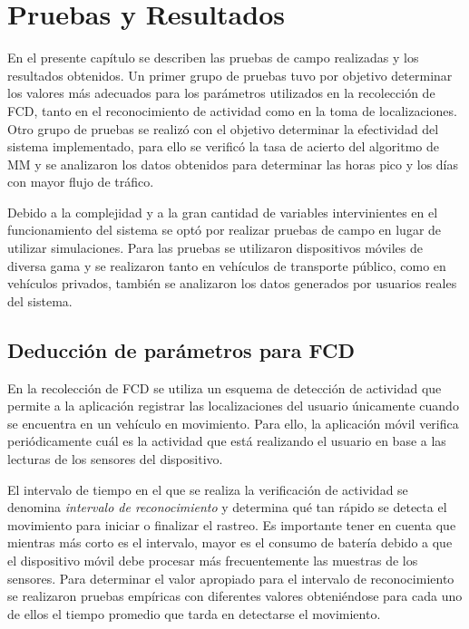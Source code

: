 \chapter{Pruebas y Resultados}
\label{cap:7}

En el presente capítulo se describen las pruebas de campo realizadas y los resultados obtenidos. Un primer grupo de pruebas tuvo por objetivo determinar los valores más adecuados para los parámetros utilizados en la recolección de FCD, tanto en el reconocimiento de actividad como en la toma de localizaciones. Otro grupo de pruebas se realizó con el objetivo determinar la efectividad del sistema implementado, para ello se verificó la tasa de acierto del algoritmo de MM y se analizaron los datos obtenidos para determinar las horas pico y los días con mayor flujo de tráfico.

Debido a la complejidad y a la gran cantidad de variables intervinientes en el funcionamiento del sistema se optó por realizar pruebas de campo en lugar de utilizar simulaciones. Para las pruebas se utilizaron dispositivos móviles de diversa gama y se realizaron tanto en vehículos de transporte público, como en vehículos privados, también se analizaron los datos generados por usuarios reales del sistema. 

\section{Deducción de parámetros para FCD}

En la recolección de FCD se utiliza un esquema de detección de actividad que permite a la aplicación registrar las localizaciones del usuario únicamente cuando se encuentra en un vehículo en movimiento. Para ello, la aplicación móvil verifica periódicamente cuál es la actividad que está realizando el usuario en base a las lecturas de los sensores del dispositivo. 

El intervalo de tiempo en el que se realiza la verificación de actividad se denomina \emph{intervalo de reconocimiento} y determina qué tan rápido se detecta el movimiento para iniciar o finalizar el rastreo. Es importante tener en cuenta que mientras más corto es el intervalo, mayor es el consumo de batería debido a que el dispositivo móvil debe procesar más frecuentemente las muestras de los sensores. Para determinar el valor apropiado para el intervalo de reconocimiento se realizaron pruebas empíricas con diferentes valores obteniéndose para cada uno de ellos el tiempo promedio que tarda en detectarse el movimiento. 

